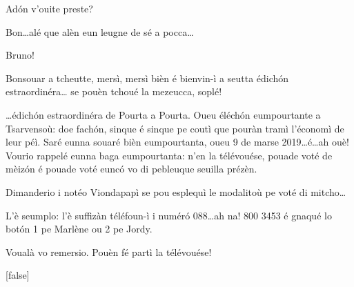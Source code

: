 \begin{drama}
\Noteospeaks {} Ad\'on v'ouite preste?


\Noteospeaks Bon\ldots alé que alèn eun leugne de sé a pocca\ldots 


\label{sigla}


\Noteospeaks Bruno!


\Brunospeaks Bonsouar a tcheutte, mersì, mersì bièn é bienvin-ì a seut\-ta édich\'on estraordinéra\ldots {} se pouèn tchoué la mezeucca, soplé!


\Brunospeaks \ldots édich\'on estraordinéra de Pourta a Pourta. Oueu éléch\'on eumpourtante a  Tsarvensoù: doe fach\'on, sinque é sinque pe coutì que pouràn tramì l'économì de leur péì. Saré eunna souaré bièn eumpourtanta, oueu 9 de marse 2019\ldots é\ldots ah ouè! Vourio rappelé eunna baga eumpourtanta: n'en la télévouése, pouade voté de mèiz\'on é pouade voté eunc\'o vo di pebleuque seuilla prézèn.


\Brunospeaks {} Dimanderio i notéo Viondapapì se pou esplequì le modalitoù pe voté di mitcho\ldots

\Noteospeaks L'è seumplo: l'è suffizàn téléfoun-ì i num\'er\'o 088\ldots ah na! 800 3453 é gnaqué lo bot\'on 1 pe Marlène ou 2 pe Jordy.
 
\Brunospeaks Voualà vo remersio. Pouèn fé partì la télévouése!



[false]


\end{drama}
